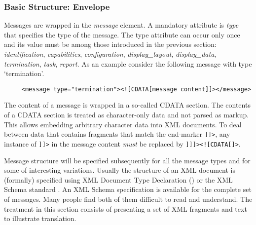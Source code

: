 \documentclass{article}
\begin{document}

   \subsubsection{Basic Structure: Envelope} \label{ss:structure}

    \noindent Messages are wrapped in the \textit{message} element. A mandatory
    attribute is \textit{type} that specifies the type of the message. The type
    attribute can occur only once and its value must be among those introduced
    in the previous section: \textit{identification}, \textit{capabilities},
    \textit{configuration}, \textit{display\_layout}, \textit{display\_data},
    \textit{termination}, \textit{task},
    \textit{report}. As an example consider the following message with type
    `termination'.
 
    \begin{verbatim}
     <message type="termination"><![CDATA[message content]]></message>\end{verbatim}

    \noindent The content of a message is wrapped in a so-called CDATA section. The
    contents of a CDATA section is treated as character-only data and not
    parsed as markup. This allows embedding arbitrary character data into XML
    documents. To deal between data that contains fragments that match the
    end-marker \verb']]>', any instance of \verb']]>' in the message content
    \textit{must} be replaced by \verb']]]><![CDATA[]>'.
    
    \noindent Message structure will be specified subsequently for all the
    message types and for some of interesting variations. Usually the structure
    of an XML document is (formally) specified using XML Document Type
    Declaration (\cite{Sperberg-McQueen:06:EML}) or the XML Schema standard
    \cite{Malhotra:06:XSP}. An XML Schema specification is available for the
    complete set of messages. Many people find both of them difficult to read
    and understand. The treatment in this section consists of presenting a set
    of XML fragments and text to illustrate translation.
\end{document}
